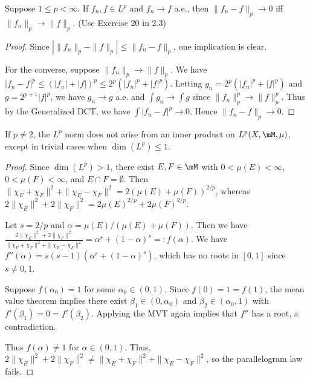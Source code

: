 \documentclass{article}
\begin{document}
 Suppose $1 \le p < \infty$. If $f_n, f \in L^p$ and $f_n \to f$ a.e., then $\|f_n - f\|_p \to 0$ iff $\|f_n\|_p \to \|f\|_p$. (Use Exercise 20 in 2.3)
\begin{proof}
Since $| \|f_n\|_p - \|f\|_p | \le \|f_n - f\|_p$, one implication is clear. 

For the converse, suppose $\|f_n\|_p \to \|f\|_p$. We have $|f_n - f|^p  \le (|f_n| + |f|)^p \le 2^p (|f_n|^p + |f|^p)$.
Letting $g_n = 2^p(|f_n|^p + |f|^p)$ and $g = 2^{p+1} |f|^p$, we have $g_n \to g$ a.e. and $\int g_n \to \int g$ since $\|f_n\|_p^p \to \|f\|_p^p$.  Thus by the Generalized DCT, we have $\int |f_n - f|^p \to 0$. Hence $\|f_n - f\|_p \to 0$.
\end{proof}

 If $p \neq 2$, the $L^p$ norm does not arise from an inner product on $L^p(X, \mM, \mu)$, except in trivial cases when $\dim(L^p) \le 1$.
\begin{proof}
Since $\dim(L^p) > 1$, there exist $E,F \in \mM$ with $0 < \mu(E) < \infty$, $0 < \mu(F) < \infty$, and $E \cap F = \emptyset$. Then
$\|\chi_E + \chi_F\|^2 + \|\chi_E - \chi_F\|^2 = 2 (\mu(E) + \mu(F))^{2/p}$, whereas $2\|\chi_E\|^2 + 2 \|\chi_F\|^2 = 2 \mu(E)^{2/p} + 2\mu(F)^{2/p}$. 

Let $s = 2/p$ and $\alpha = \mu(E)/(\mu(E) + \mu(F))$. Then we have $\frac{2\|\chi_E\|^2 + 2 \|\chi_F\|^2}{\|\chi_E + \chi_F\|^2 + \|\chi_E - \chi_F\|^2} = \alpha^s + (1 - \alpha)^s =: f(\alpha)$. We have $f''(\alpha) = s(s-1) (\alpha^s  + (1 - \alpha)^s)$, which has no roots in $[0,1]$ since $s \neq 0, 1$.

Suppose $f(\alpha_0) = 1$ for some $\alpha_0 \in (0,1)$.  Since $f(0) = 1 = f(1)$, the mean value theorem implies there exist $\beta_1 \in (0,\alpha_0)$ and $\beta_2 \in (\alpha_0,1)$ with $f'(\beta_1) = 0 = f'(\beta_2)$.  Applying the MVT again implies that $f''$ has a root, a contradiction.

Thus $f(\alpha) \neq 1$ for $\alpha \in (0,1)$.  Thus, $2\|\chi_E\|^2 + 2 \|\chi_F\|^2 \neq \|\chi_E + \chi_F\|^2 + \|\chi_E - \chi_F\|^2$, so the parallelogram law fails.
\end{proof}
\end{document}
